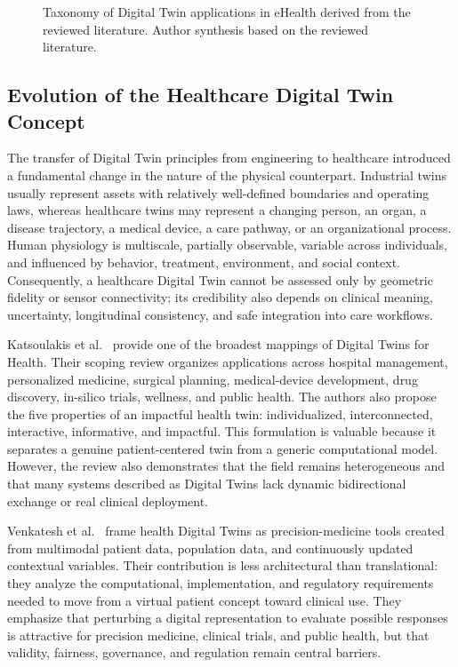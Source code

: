 \begin{figure}[H]
    \centering
    \resizebox{0.98\textwidth}{!}{}
    \caption{Taxonomy of Digital Twin applications in eHealth derived from the reviewed literature. Author synthesis based on the reviewed literature.}
    \label{fig:ehealth_dt_taxonomy_synthesis}
\end{figure}

\subsection{Evolution of the Healthcare Digital Twin Concept}
The transfer of Digital Twin principles from engineering to healthcare introduced a fundamental change in the nature of the physical counterpart. Industrial twins usually represent assets with relatively well-defined boundaries and operating laws, whereas healthcare twins may represent a changing person, an organ, a disease trajectory, a medical device, a care pathway, or an organizational process. Human physiology is multiscale, partially observable, variable across individuals, and influenced by behavior, treatment, environment, and social context. Consequently, a healthcare Digital Twin cannot be assessed only by geometric fidelity or sensor connectivity; its credibility also depends on clinical meaning, uncertainty, longitudinal consistency, and safe integration into care workflows.

Katsoulakis et al.~\cite{katsoulakis2024digital} provide one of the broadest mappings of Digital Twins for Health. Their scoping review organizes applications across hospital management, personalized medicine, surgical planning, medical-device development, drug discovery, in-silico trials, wellness, and public health. The authors also propose the five properties of an impactful health twin: individualized, interconnected, interactive, informative, and impactful. This formulation is valuable because it separates a genuine patient-centered twin from a generic computational model. However, the review also demonstrates that the field remains heterogeneous and that many systems described as Digital Twins lack dynamic bidirectional exchange or real clinical deployment.

Venkatesh et al.~\cite{venkatesh2022health} frame health Digital Twins as precision-medicine tools created from multimodal patient data, population data, and continuously updated contextual variables. Their contribution is less architectural than translational: they analyze the computational, implementation, and regulatory requirements needed to move from a virtual patient concept toward clinical use. They emphasize that perturbing a digital representation to evaluate possible responses is attractive for precision medicine, clinical trials, and public health, but that validity, fairness, governance, and regulation remain central barriers.

